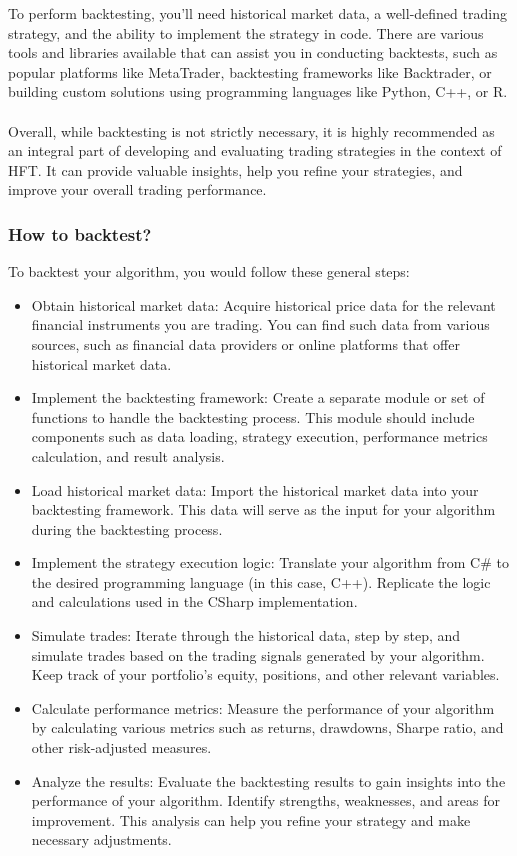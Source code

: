 \documentclass{assignment}
\begin{document}
\begin{problem}
To perform backtesting, you'll need historical market data, a well-defined trading strategy, and the ability to implement the strategy in code. There are various tools and libraries available that can assist you in conducting backtests, such as popular platforms like MetaTrader, backtesting frameworks like Backtrader, or building custom solutions using programming languages like Python, C++, or R.\\\\
Overall, while backtesting is not strictly necessary, it is highly recommended as an integral part of developing and evaluating trading strategies in the context of HFT. It can provide valuable insights, help you refine your strategies, and improve your overall trading performance.


\subsubsection*{How to backtest?}
\noindent To backtest your algorithm, you would follow these general steps:\\
\begin{itemize}
    \item Obtain historical market data: Acquire historical price data for the relevant financial instruments you are trading. You can find such data from various sources, such as financial data providers or online platforms that offer historical market data.
    \item Implement the backtesting framework: Create a separate module or set of functions to handle the backtesting process. This module should include components such as data loading, strategy execution, performance metrics calculation, and result analysis.
    \item Load historical market data: Import the historical market data into your backtesting framework. This data will serve as the input for your algorithm during the backtesting process.
    \item Implement the strategy execution logic: Translate your algorithm from C# to the desired programming language (in this case, C++). Replicate the logic and calculations used in the CSharp implementation.
    \item Simulate trades: Iterate through the historical data, step by step, and simulate trades based on the trading signals generated by your algorithm. Keep track of your portfolio's equity, positions, and other relevant variables.
    \item Calculate performance metrics: Measure the performance of your algorithm by calculating various metrics such as returns, drawdowns, Sharpe ratio, and other risk-adjusted measures.
    \item Analyze the results: Evaluate the backtesting results to gain insights into the performance of your algorithm. Identify strengths, weaknesses, and areas for improvement. This analysis can help you refine your strategy and make necessary adjustments.
\end{itemize}


\end{problem}
\end{document}

